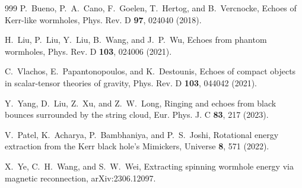 \documentclass[aps,preprint,groupedaddress,nofootinbib,superscriptaddress,showkeys,showpacs,eqsecnum,amsmath,amssymb]{revtex4-1}
\begin{document}
\begin{thebibliography}{999}
P.~Bueno, P.~A.~Cano, F.~Goelen, T.~Hertog, and B.~Vercnocke,
Echoes of Kerr-like wormholes,
Phys. Rev. D \textbf{97}, 024040 (2018).

H.~Liu, P.~Liu, Y.~Liu, B.~Wang, and J.~P.~Wu,
Echoes from phantom wormholes,
Phys. Rev. D \textbf{103}, 024006 (2021).

C.~Vlachos, E.~Papantonopoulos, and K.~Destounis,
Echoes of compact objects in scalar-tensor theories of gravity,
Phys. Rev. D \textbf{103}, 044042 (2021).

Y.~Yang, D.~Liu, Z.~Xu, and Z.~W.~Long,
Ringing and echoes from black bounces surrounded by the string cloud,
Eur. Phys. J. C \textbf{83}, 217 (2023).


V.~Patel, K.~Acharya, P.~Bambhaniya, and P.~S.~Joshi,
Rotational energy extraction from the Kerr black hole\textquoteright{}s Mimickers,
Universe \textbf{8}, 571 (2022).


X.~Ye, C.~H.~Wang, and S.~W.~Wei,
Extracting spinning wormhole energy via magnetic reconnection, arXiv:2306.12097.

























\end{thebibliography}
\end{document}
